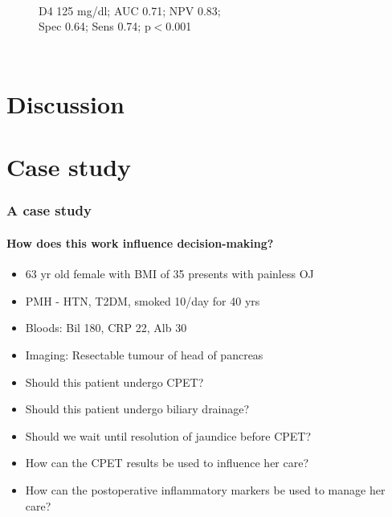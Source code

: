 \documentclass[10pt]{beamer}
\begin{document}
\begin{frame}
\begin{columns}
\begin{figure}
				\\{\scriptsize D4 125 mg/dl; AUC 0.71; NPV 0.83; \\Spec 0.64; Sens 0.74; p$<$0.001}
			\end{figure}
	\end{columns}
\end{frame}



\section[Chapter 7]{Discussion}



\section{Case study}
\begin{frame}
	\frametitle{A case study}
	\framesubtitle{How does this work influence decision-making?}
	\begin{itemize}
		\item 63 yr old female with BMI of 35 presents with painless OJ
		\item PMH - HTN, T2DM, smoked 10/day for 40 yrs
		\item Bloods: Bil 180, CRP 22, Alb 30
		\item Imaging: Resectable tumour of head of pancreas
		\medskip
		\item Should this patient undergo CPET?
		\item Should this patient undergo biliary drainage?
		\item Should we wait until resolution of jaundice before CPET?
		\item How can the CPET results be used to influence her care?
		\item How can the postoperative inflammatory markers be used to manage her care?
	\end{itemize}
\end{frame}
\end{document}
